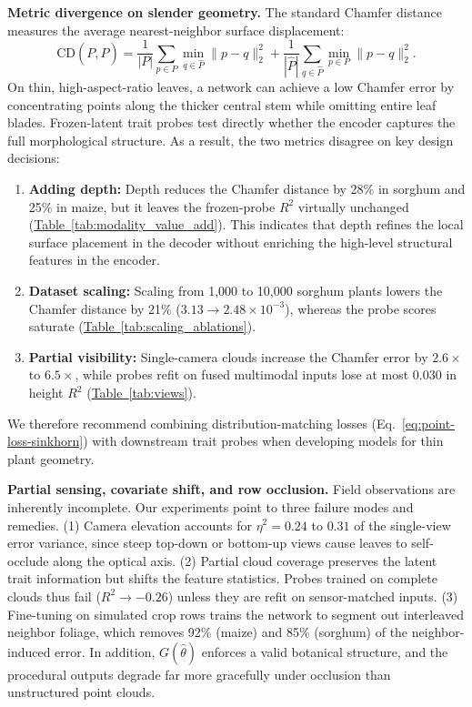 \documentclass[10pt,twocolumn,letterpaper]{article}
\newcommand{\tabref}[1]{\hyperref[#1]{Table~\ref*{#1}}}
\begin{document}
\noindent\textbf{Metric divergence on slender geometry.}
The standard Chamfer distance measures the average nearest-neighbor surface displacement:
\begin{equation}
  \mathrm{CD}(P, \hat P) = \frac{1}{|P|}\sum_{p\in P}\min_{q\in\hat P}\|p-q\|_2^2 + \frac{1}{|\hat P|}\sum_{q\in\hat P}\min_{p\in P}\|p-q\|_2^2.
  \label{eq:chamfer_def}
\end{equation}
On thin, high-aspect-ratio leaves, a network can achieve a low Chamfer error by concentrating points along the thicker central stem while omitting entire leaf blades. Frozen-latent trait probes test directly whether the encoder captures the full morphological structure. As a result, the two metrics disagree on key design decisions:
\begin{enumerate}
  \item \textbf{Adding depth:} Depth reduces the Chamfer distance by 28\% in sorghum and 25\% in maize, but it leaves the frozen-probe $R^2$ virtually unchanged (\tabref{tab:modality_value_add}). This indicates that depth refines the local surface placement in the decoder without enriching the high-level structural features in the encoder.
  \item \textbf{Dataset scaling:} Scaling from 1{,}000 to 10{,}000 sorghum plants lowers the Chamfer distance by 21\% ($3.13 \to 2.48 \times 10^{-3}$), whereas the probe scores saturate (\tabref{tab:scaling_ablations}).
  \item \textbf{Partial visibility:} Single-camera clouds increase the Chamfer error by $2.6\times$ to $6.5\times$, while probes refit on fused multimodal inputs lose at most 0.030 in height $R^2$ (\tabref{tab:views}).
\end{enumerate}
We therefore recommend combining distribution-matching losses (Eq.~\ref{eq:point-loss-sinkhorn}) with downstream trait probes when developing models for thin plant geometry.

\noindent\textbf{Partial sensing, covariate shift, and row occlusion.}
Field observations are inherently incomplete. Our experiments point to three failure modes and remedies. (1) Camera elevation accounts for $\eta^2 = 0.24$ to $0.31$ of the single-view error variance, since steep top-down or bottom-up views cause leaves to self-occlude along the optical axis. (2) Partial cloud coverage preserves the latent trait information but shifts the feature statistics. Probes trained on complete clouds thus fail ($R^2 \to -0.26$) unless they are refit on sensor-matched inputs. (3) Fine-tuning on simulated crop rows trains the network to segment out interleaved neighbor foliage, which removes 92\% (maize) and 85\% (sorghum) of the neighbor-induced error. In addition, $G(\hat\theta)$ enforces a valid botanical structure, and the procedural outputs degrade far more gracefully under occlusion than unstructured point clouds.
\end{document}
